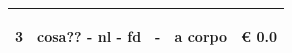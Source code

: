 \documentclass[a4paper]{article}
\begin{document}
\begin{tabular}{ | L{10mm} |  L{86mm} | L{12mm} | L{12mm} | L{16mm} | }
                            
                              \vspace{2.5mm}
                              \begin{spacing}{0}
                           3
                              \end{spacing} &
                              \vspace{2.5mm}
                              \begin{spacing}{0}
                           cosa?? - nl - fd
                              \end{spacing} &
                              \vspace{2.5mm}
                              \begin{spacing}{0}
                           -
                              \end{spacing} &
                              \vspace{2.5mm}
                              \begin{spacing}{0}
                           a corpo
                              \end{spacing} &
                              \vspace{2.5mm}
                              \begin{spacing}{0}
                                \euro\hfill 
                            0.0
                              \end{spacing} \\
                              \hline


\end{tabular}
\end{document}
